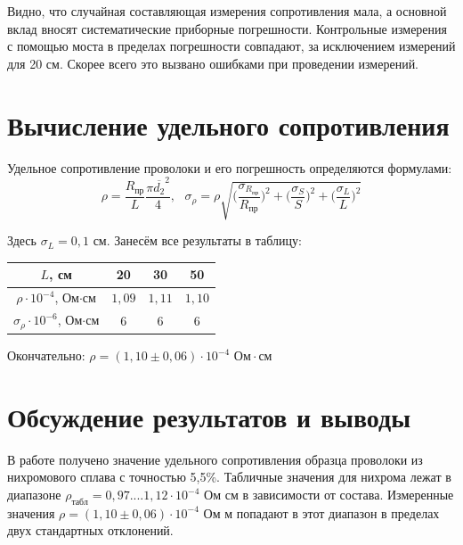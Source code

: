 Видно, что случайная составляющая измерения сопротивления мала,
а основной вклад вносят систематические приборные погрешности.
Контрольные измерения с помощью моста в пределах погрешности совпадают, за исключением измерений для 20 см.
Скорее всего это вызвано ошибками при проведении измерений.

\section{Вычисление удельного сопротивления}

Удельное сопротивление проволоки и его погрешность определяются формулами:
\[\rho = \frac{R_{\text{пр}}}{L} \frac{\pi \overline{d_{2}}^2}{4}, \text{ } \sigma_{\rho} = \rho \sqrt{\Big( \frac{\sigma_{R_{\text{пр}}}}{R_{\text{пр}}}\Big) ^2 + \Big(\frac{\sigma_S}{S} \Big)^2 + \Big(\frac{\sigma_L}{L} \Big)^2}\]

Здесь $\sigma_{L} = 0,1$ см.
Занесём все результаты в таблицу:
\begin{center}
    \begin{tabular}{|c|c|c|c|}
        \hline
        $L$, см                                   & 20     & 30     & 50     \\
        \hline
        $\rho \cdot 10^{-4}$, Ом$\cdot$см         & $1,09$ & $1,11$ & $1,10$ \\
        \hline
        $\sigma_{\rho}\cdot 10^{-6}$, Ом$\cdot$см & $6$    & $6$    & $6$    \\
        \hline
    \end{tabular}
\end{center}

Окончательно: $\rho = (1,10 \pm 0,06) \cdot 10^{-4} \text{ Ом} \cdot \text{см}$

\section{Обсуждение результатов и выводы}


В работе получено значение удельного сопротивления образца проволоки из нихромового сплава с точностью 5,5\%.
Табличные значения для нихрома лежат в диапазоне $\rho_{табл} = 0,97 .... 1,12\cdot10^{-4}$ Ом см в зависимости от состава.
Измеренные значения $\rho = (1,10 \pm 0,06) \cdot 10^{-4}$ Ом м попадают в этот диапазон в пределах двух стандартных отклонений.





